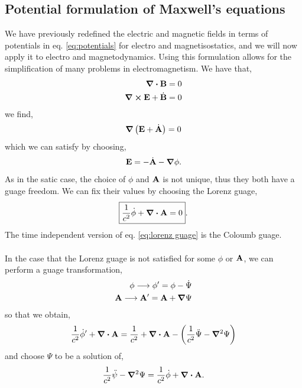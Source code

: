 \documentclass{book}
\begin{document}
\subsection{Potential formulation of Maxwell's equations}
We have previously redefined the electric and magnetic fields in terms of potentials in eq. \eqref{eq:potentials} for electro and magnetisostatics, and we will now apply it to electro and magnetodynamics. Using this formulation allows for the simplification of many problems in electromagnetism. We have that,
\begin{align}
	\div{\vb{B}} = 0 \\
	\curl{\vb{E}}+\Dot{\vb{B}} = 0
\end{align}
we find,
\begin{equation}
	\grad{\left(\vb{E} + \Dot{\vb{A}}\right)} = 0 
\end{equation}
which we can satisfy by choosing,
\begin{equation}
	\vb{E}= - \Dot{\vb{A}} - \grad \phi.
\end{equation}
As in the satic case, the choice of $\phi$ and $\vb{A}$ is not unique, thus they both have a guage freedom. We can fix their values by choosing the Lorenz guage,
\begin{equation}
	\boxed{\frac{1}{c^2}\Dot{\phi} + \div{\vb{A}} = 0}. \label{eq:lorenz guage}
\end{equation}
The time independent version of eq. \eqref{eq:lorenz guage} is the Coloumb guage.
\\\\
In the case that the Lorenz guage is not satisfied for some $\phi$ or $\vb{A}$, we can perform a guage transformation,
\begin{align}
	\phi \longrightarrow \phi' = \phi - \Dot{\Psi} \\
	\vb{A} \longrightarrow \vb{A}' = \vb{A} + \grad{\Psi}
\end{align}
so that we obtain,
\begin{equation}
	\frac{1}{c^2}\Dot{\phi}' + \div{\vb{A}} = \frac{1}{c^2}+\div{\vb{A}} - \left(\frac{1}{c^2}\ddot{\Psi} - \grad^2\Psi\right)
\end{equation}
and choose $\Psi$ to be a solution of,
\begin{equation}
	\frac{1}{c^2}\Ddot{\psi}-\grad^2\Psi = \frac{1}{c^2}\Dot{\phi} + \div{\vb{A}}.
\end{equation}
\end{document}
